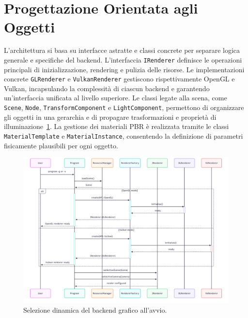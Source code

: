 \documentclass[12pt,a4paper,openright,twoside]{book}
\begin{document}
\section{Progettazione Orientata agli Oggetti}
L'architettura si basa su interfacce astratte e classi concrete per separare logica generale e specifiche del backend.
L'interfaccia \texttt{IRenderer} definisce le operazioni principali di inizializzazione, rendering e pulizia delle risorse.
Le implementazioni concrete \texttt{GLRenderer} e \texttt{VulkanRenderer} gestiscono rispettivamente OpenGL e Vulkan,
incapsulando la complessità di ciascun backend e garantendo un'interfaccia unificata al livello superiore.
Le classi legate alla scena, come \texttt{Scene}, \texttt{Node}, \texttt{TransformComponent} e \texttt{LightComponent},
permettono di organizzare gli oggetti in una gerarchia e di propagare trasformazioni e proprietà
di illuminazione~\ref{fig:uml-activity-dynamic-backend}. La gestione dei materiali PBR è realizzata tramite le classi
\texttt{MaterialTemplate} e \texttt{MaterialInstance}, consentendo la definizione di parametri fisicamente plausibili per ogni oggetto.
\begin{figure}[H]
    \centering
    \includegraphics[width=.95\linewidth]{figures/uml_activity_dynamic_backend.png}
    \caption{Selezione dinamica del backend grafico all'avvio.}
    \label{fig:uml-activity-dynamic-backend}
\end{figure}
\end{document}
